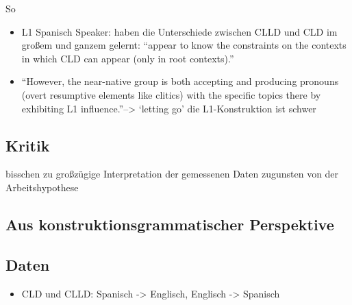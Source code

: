 So
\begin{itemize}
    \item L1 Spanisch Speaker: haben die Unterschiede zwischen CLLD und CLD im großem und ganzem gelernt: ``appear to know the constraints on the contexts in which CLD can appear (only in root contexts).''
    \item ``However, the near-native group is both accepting and producing pronouns (overt resumptive elements like clitics) with the specific topics there by exhibiting L1 influence.''--> `letting go' die L1-Konstruktion ist schwer
\end{itemize}


\subsection{Kritik}
bisschen zu großzügige Interpretation der gemessenen Daten zugunsten von der Arbeitshypothese

\subsection{Aus konstruktionsgrammatischer Perspektive}

\subsection{Daten}
\begin{itemize}
    \item \cite{Valenzuela05} CLD und CLLD: Spanisch -> Englisch, Englisch -> Spanisch
%
%
\end{itemize}
